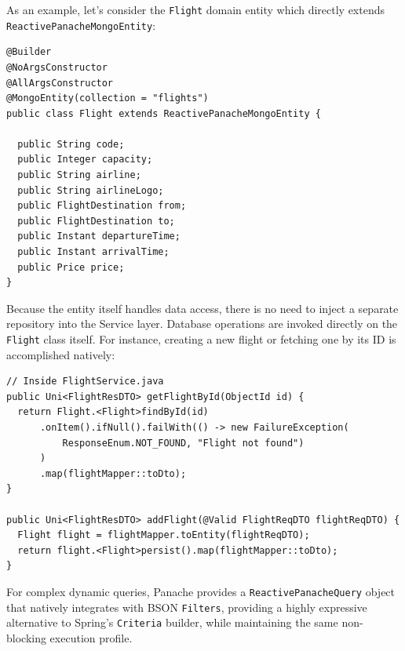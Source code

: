 As an example, let's consider the \texttt{Flight} domain entity which directly extends \texttt{ReactivePanacheMongoEntity}:

\begin{lstlisting}[language=JavaExtended, caption={Quarkus Panache Active Record Entity}, label={lst:quarkus_entity}]
@Builder
@NoArgsConstructor
@AllArgsConstructor
@MongoEntity(collection = "flights")
public class Flight extends ReactivePanacheMongoEntity {

  public String code;
  public Integer capacity;
  public String airline;
  public String airlineLogo;
  public FlightDestination from;
  public FlightDestination to;
  public Instant departureTime;
  public Instant arrivalTime;
  public Price price;
}
\end{lstlisting}

Because the entity itself handles data access, there is no need to inject a separate repository into the Service layer. Database operations are invoked directly on the \texttt{Flight} class itself. For instance, creating a new flight or fetching one by its ID is accomplished natively:

\begin{lstlisting}[language=JavaExtended, caption={Quarkus Mutiny and Panache Service Logic}, label={lst:quarkus_service}]
// Inside FlightService.java
public Uni<FlightResDTO> getFlightById(ObjectId id) {
  return Flight.<Flight>findById(id)
      .onItem().ifNull().failWith(() -> new FailureException(
          ResponseEnum.NOT_FOUND, "Flight not found")
      )
      .map(flightMapper::toDto);
}

public Uni<FlightResDTO> addFlight(@Valid FlightReqDTO flightReqDTO) {
  Flight flight = flightMapper.toEntity(flightReqDTO);
  return flight.<Flight>persist().map(flightMapper::toDto);
}
\end{lstlisting}

For complex dynamic queries, Panache provides a \texttt{ReactivePanacheQuery} object that natively integrates with BSON \texttt{Filters}, providing a highly expressive alternative to Spring's \texttt{Criteria} builder, while maintaining the same non-blocking execution profile.

